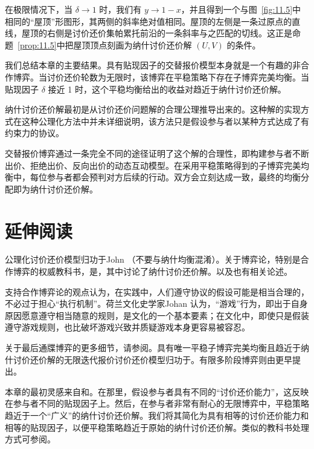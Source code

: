 在极限情况下，当 \(\delta  \rightarrow  1\) 时，我们有 \(y \rightarrow  1 - x\)，并且得到一个与图~\ref{fig:11.5}中相同的“屋顶”形图形，其两侧的斜率绝对值相同。屋顶的左侧是一条过原点的直线，屋顶的右侧是讨价还价集帕累托前沿的一条斜率与之匹配的切线。这正是命题~\ref{prop:11.5}中把屋顶顶点刻画为纳什讨价还价解 $(U,V)$ 的条件。

我们总结本章的主要结果。具有贴现因子的交替报价模型本身就是一个有趣的非合作博弈。当讨价还价轮数为无限时，该博弈在平稳策略下存在子博弈完美均衡。当贴现因子 \(\delta\) 接近 1 时，这个平稳均衡给出的收益对趋近于纳什讨价还价解。

纳什讨价还价解最初是从讨价还价问题解的合理公理推导出来的。这种解的实现方式在这种公理化方法中并未详细说明，该方法只是假设参与者以某种方式达成了有约束力的协议。

交替报价博弈通过一条完全不同的途径证明了这个解的合理性，即构建参与者不断出价、拒绝出价、反向出价的动态互动模型。在采用平稳策略得到的子博弈完美均衡中，每位参与者都会预判对方后续的行动。双方会立刻达成一致，最终的均衡分配即为纳什讨价还价解。


\section{延伸阅读}\label{sec11.12}

公理化讨价还价模型归功于John \citet{nash1950}（不要与纳什均衡混淆）。关于博弈论，特别是合作博弈的权威教科书，是\citet*[Chapter~15]{maschler2013}，其中讨论了纳什讨价还价解。\citet[Chapter~15]{osborne1994}以及\citet[Section~16.3]{osborne2004}也有相关论述。

支持合作博弈论的观点认为，在实践中，人们遵守协议的假设可能是相当合理的，不必过于担心“执行机制”。荷兰文化史学家Johan \citet{huizinga1949}认为，“游戏”行为，即出于自身原因愿意遵守相当随意的规则，是文化的一个基本要素；在文化中，即使只是假装遵守游戏规则，也比破坏游戏兴致并质疑游戏本身更容易被容忍。


关于最后通牒博弈的更多细节，请参阅\citet[Section~6.1.1]{osborne2004}。具有唯一平稳子博弈完美均衡且趋近于纳什讨价还价解的无限迭代报价讨价还价模型归功于\citet{rubinstein1982}。有限多阶段博弈则由\citet{stahl1972}更早提出。

本章的最初灵感来自\citet[Chapter~5]{binmore1992}和\citet[Chapters~16 and~17]{binmore2007}。在那里，假设参与者具有不同的“讨价还价能力”，这反映在参与者不同的贴现因子上。然后，在参与者非常有耐心的无限博弈中，平稳策略趋近于一个“广义”的纳什讨价还价解。我们将其简化为具有相等的讨价还价能力和相等的贴现因子，以便平稳策略趋近于原始的纳什讨价还价解。类似的教科书处理方式可参阅\citet[Chapter~16]{osborne2004}。



